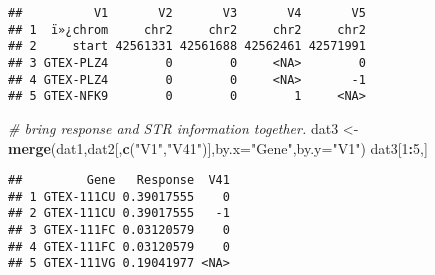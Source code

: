 \documentclass[
]{article}
\newenvironment{Shaded}{\begin{snugshade}}{\end{snugshade}}
\newcommand{\CommentTok}[1]{\textcolor[rgb]{0.56,0.35,0.01}{\textit{#1}}}
\newcommand{\DataTypeTok}[1]{\textcolor[rgb]{0.13,0.29,0.53}{#1}}
\newcommand{\DecValTok}[1]{\textcolor[rgb]{0.00,0.00,0.81}{#1}}
\newcommand{\KeywordTok}[1]{\textcolor[rgb]{0.13,0.29,0.53}{\textbf{#1}}}
\newcommand{\NormalTok}[1]{#1}
\newcommand{\OperatorTok}[1]{\textcolor[rgb]{0.81,0.36,0.00}{\textbf{#1}}}
\newcommand{\StringTok}[1]{\textcolor[rgb]{0.31,0.60,0.02}{#1}}
\begin{document}
\begin{verbatim}
##          V1       V2       V3       V4       V5
## 1  ï»¿chrom     chr2     chr2     chr2     chr2
## 2     start 42561331 42561688 42562461 42571991
## 3 GTEX-PLZ4        0        0     <NA>        0
## 4 GTEX-PLZ4        0        0     <NA>       -1
## 5 GTEX-NFK9        0        0        1     <NA>
\end{verbatim}

\begin{Shaded}
\begin{Highlighting}[]
\CommentTok{# bring response and STR information together.}
\NormalTok{dat3 <-}\StringTok{ }\KeywordTok{merge}\NormalTok{(dat1,dat2[,}\KeywordTok{c}\NormalTok{(}\StringTok{"V1"}\NormalTok{,}\StringTok{"V41"}\NormalTok{)],}\DataTypeTok{by.x=}\StringTok{"Gene"}\NormalTok{,}\DataTypeTok{by.y=}\StringTok{"V1"}\NormalTok{)}
\NormalTok{dat3[}\DecValTok{1}\OperatorTok{:}\DecValTok{5}\NormalTok{,]}
\end{Highlighting}
\end{Shaded}

\begin{verbatim}
##         Gene   Response  V41
## 1 GTEX-111CU 0.39017555    0
## 2 GTEX-111CU 0.39017555   -1
## 3 GTEX-111FC 0.03120579    0
## 4 GTEX-111FC 0.03120579    0
## 5 GTEX-111VG 0.19041977 <NA>
\end{verbatim}

\begin{Shaded}
\end{Shaded}
\end{document}
